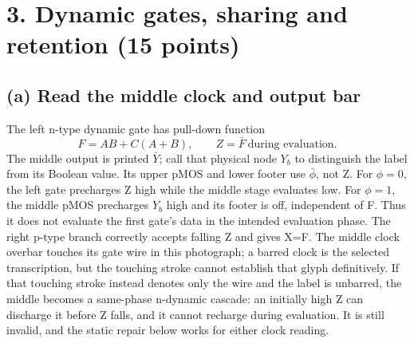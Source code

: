 \documentclass[10pt]{article}
\begin{document}
\newpage\section*{3. Dynamic gates, sharing and retention (15 points)}
\subsection*{(a) Read the middle clock and output bar}
The left n-type dynamic gate has pull-down function
\[F=AB+C(A+B),\qquad Z=\bar F\ \text{during evaluation}.\]
The middle output is printed $\bar Y$; call that physical node $Y_b$ to distinguish the label from its Boolean value. Its upper pMOS and lower footer use $\bar\phi$, not Z. For $\phi=0$, the left gate precharges Z high while the middle stage evaluates low. For $\phi=1$, the middle pMOS precharges $Y_b$ high and its footer is off, independent of F. Thus it does not evaluate the first gate's data in the intended evaluation phase. The right p-type branch correctly accepts falling Z and gives X=F. The middle clock overbar touches its gate wire in this photograph; a barred clock is the selected transcription, but the touching stroke cannot establish that glyph definitively. If that touching stroke instead denotes only the wire and the label is unbarred, the middle becomes a same-phase n-dynamic cascade: an initially high Z can discharge it before Z falls, and it cannot recharge during evaluation. It is still invalid, and the static repair below works for either clock reading.
\end{document}
